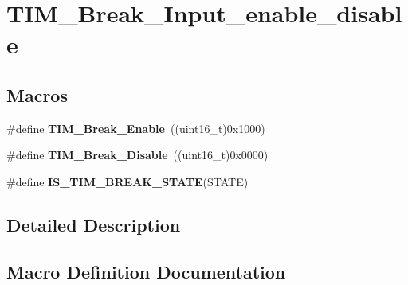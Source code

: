 \hypertarget{group___t_i_m___break___input__enable__disable}{}\section{T\+I\+M\+\_\+\+Break\+\_\+\+Input\+\_\+enable\+\_\+disable}
\label{group___t_i_m___break___input__enable__disable}
\subsection*{Macros}
\begin{DoxyCompactItemize}
\item 
\#define {\bfseries T\+I\+M\+\_\+\+Break\+\_\+\+Enable}~((uint16\+\_\+t)0x1000)\hypertarget{group___t_i_m___break___input__enable__disable_gae7fbc11ac043454b2a880bffe98fdb8c}{}\label{group___t_i_m___break___input__enable__disable_gae7fbc11ac043454b2a880bffe98fdb8c}

\item 
\#define {\bfseries T\+I\+M\+\_\+\+Break\+\_\+\+Disable}~((uint16\+\_\+t)0x0000)\hypertarget{group___t_i_m___break___input__enable__disable_ga31ba16dd70ad4d99adc911f7bf6662e5}{}\label{group___t_i_m___break___input__enable__disable_ga31ba16dd70ad4d99adc911f7bf6662e5}

\item 
\#define {\bfseries I\+S\+\_\+\+T\+I\+M\+\_\+\+B\+R\+E\+A\+K\+\_\+\+S\+T\+A\+TE}(S\+T\+A\+TE)
\end{DoxyCompactItemize}


\subsection{Detailed Description}


\subsection{Macro Definition Documentation}
